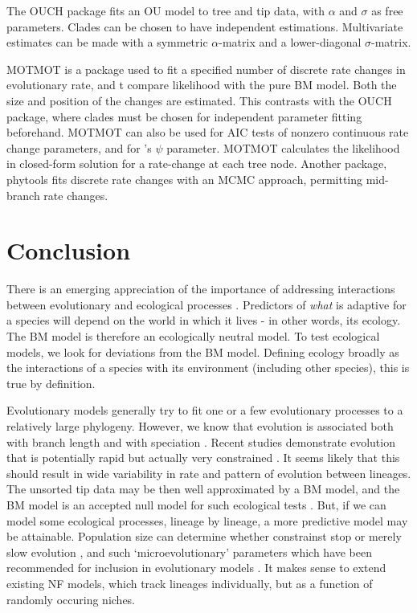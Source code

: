 \documentclass[12pt]{article}
\begin{document}
The OUCH package \citep{king_package_2012} fits an OU model to tree and tip data, with $\alpha$ and $\sigma$ as free parameters. 
Clades can be chosen to have independent estimations. 
Multivariate estimates can be made with a symmetric $\alpha$-matrix and a lower-diagonal $\sigma$-matrix.

MOTMOT \citep{thomas_motmot:_2012} is a package used to fit a specified number of discrete rate changes in evolutionary rate, and t compare likelihood with the pure BM model. 
Both the size and position of the changes are estimated. 
This contrasts with the OUCH package, where clades must be chosen for independent parameter fitting beforehand.
MOTMOT can also be used for AIC tests of nonzero continuous rate change parameters, and for \citet{ingram_speciation_2010}'s $\psi$ parameter. 
MOTMOT calculates the likelihood in closed-form solution for a rate-change at each tree node. 
Another package, phytools \citep{revell_phytools:_2012,revell_new_2012} fits discrete rate changes with an MCMC approach, permitting mid-branch rate changes.

\section{Conclusion}

There is an emerging appreciation of the importance of addressing interactions between evolutionary and ecological processes \citep{schoener_newest_2011}.
Predictors of \emph{what} is adaptive for a species will depend on the world in which it lives - in other words, its ecology. 
The BM model is therefore an ecologically neutral model. 
To test ecological models, we look for deviations from the BM model. 
Defining ecology broadly as the interactions of a species with its environment (including other species), this is true by definition.

Evolutionary models generally try to fit one or a few evolutionary processes to a relatively large phylogeny. 
However, we know that evolution is associated both with branch length and with speciation \citep{uyeda_the_2011}.
Recent studies demonstrate evolution that is potentially rapid but actually very constrained \citep{harmon_early_2010,charmantier_adaptive_2008}.
It seems likely that this should result in wide variability in rate and pattern of evolution between lineages.
The unsorted tip data may be then well approximated by a BM model, and the BM model is an accepted null model for such ecological tests \citep{davies_using_2012}.
But, if we can model some ecological processes, lineage by lineage, a more predictive model may be attainable.
Population size can determine whether constrainst stop or merely slow evolution \citep{gomulkiewicz_demographic_2009}, and such `microevolutionary' parameters which have been recommended for inclusion in evolutionary models \citep{yoder_ecological_2010}.
It makes sense to extend existing NF models, which track lineages individually, but as a function of randomly occuring niches. 
\end{document}
